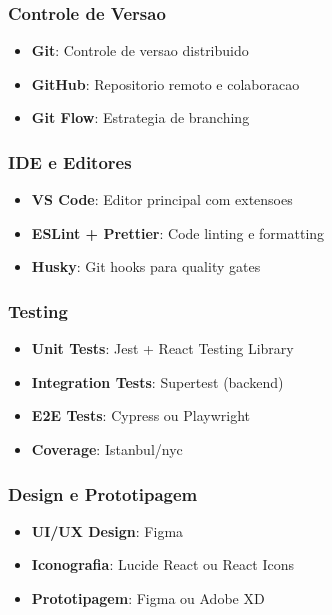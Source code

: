 \subsubsection{Controle de Versao}
\begin{itemize}
    \item \textbf{Git}: Controle de versao distribuido
    \item \textbf{GitHub}: Repositorio remoto e colaboracao
    \item \textbf{Git Flow}: Estrategia de branching
\end{itemize}

\subsubsection{IDE e Editores}
\begin{itemize}
    \item \textbf{VS Code}: Editor principal com extensoes
    \item \textbf{ESLint + Prettier}: Code linting e formatting
    \item \textbf{Husky}: Git hooks para quality gates
\end{itemize}

\subsubsection{Testing}
\begin{itemize}
    \item \textbf{Unit Tests}: Jest + React Testing Library
    \item \textbf{Integration Tests}: Supertest (backend)
    \item \textbf{E2E Tests}: Cypress ou Playwright
    \item \textbf{Coverage}: Istanbul/nyc
\end{itemize}

\subsubsection{Design e Prototipagem}
\begin{itemize}
    \item \textbf{UI/UX Design}: Figma
    \item \textbf{Iconografia}: Lucide React ou React Icons
    \item \textbf{Prototipagem}: Figma ou Adobe XD
\end{itemize}

